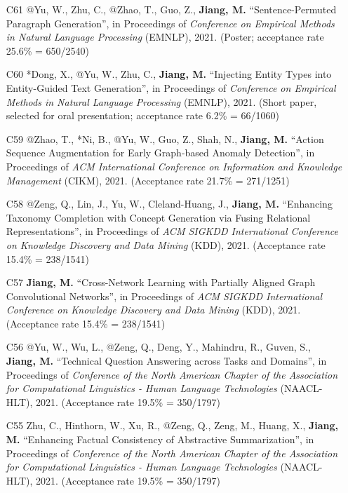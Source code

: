 \documentclass[10pt]{article}
\newenvironment{myindentpar}[1]%
{\begin{list}{}%
         {\setlength{\leftmargin}{#1}}%
         \item[]%
}
{\end{list}}
\newcounter{list}
\begin{document}
\begin{myindentpar}{0.00cm}
\begin{enumerate}[leftmargin=.5cm]
\item[C61] @Yu, W., Zhu, C., @Zhao, T., Guo, Z., \textbf{Jiang, M.} ``Sentence-Permuted Paragraph Generation'', in Proceedings of \textit{Conference on Empirical Methods in Natural Language Processing} (EMNLP), 2021. (Poster; acceptance rate 25.6\% = 650/2540)

\item[C60] *Dong, X., @Yu, W., Zhu, C., \textbf{Jiang, M.} ``Injecting Entity Types into Entity-Guided Text Generation'', in Proceedings of \textit{Conference on Empirical Methods in Natural Language Processing} (EMNLP), 2021. (Short paper, selected for oral presentation; acceptance rate 6.2\% = 66/1060)

\item[C59] @Zhao, T., *Ni, B., @Yu, W., Guo, Z., Shah, N., \textbf{Jiang, M.} ``Action Sequence Augmentation for Early Graph-based Anomaly Detection'', in Proceedings of \textit{ACM International Conference on Information and Knowledge Management} (CIKM), 2021. (Acceptance rate 21.7\% = 271/1251)
		
\item[C58] @Zeng, Q., Lin, J., Yu, W., Cleland-Huang, J., \textbf{Jiang, M.} ``Enhancing Taxonomy Completion with Concept Generation via Fusing Relational Representations'', in Proceedings of \textit{ACM SIGKDD International Conference on Knowledge Discovery and Data Mining} (KDD), 2021. (Acceptance rate 15.4\% = 238/1541)

\item[C57] \textbf{Jiang, M.} ``Cross-Network Learning with Partially Aligned Graph Convolutional Networks'', in Proceedings of \textit{ACM SIGKDD International Conference on Knowledge Discovery and Data Mining} (KDD), 2021. (Acceptance rate 15.4\% = 238/1541)	

\item[C56] @Yu, W., Wu, L., @Zeng, Q., Deng, Y., Mahindru, R., Guven, S., \textbf{Jiang, M.} ``Technical Question Answering across Tasks and Domains'', in Proceedings of \textit{Conference of the North American Chapter of the Association for Computational Linguistics - Human Language Technologies} (NAACL-HLT), 2021. (Acceptance rate 19.5\% = 350/1797)

\item[C55] Zhu, C., Hinthorn, W., Xu, R., @Zeng, Q., Zeng, M., Huang, X., \textbf{Jiang, M.} ``Enhancing Factual Consistency of Abstractive Summarization'', in Proceedings of \textit{Conference of the North American Chapter of the Association for Computational Linguistics - Human Language Technologies} (NAACL-HLT), 2021. (Acceptance rate 19.5\% = 350/1797)


\end{enumerate}
\end{myindentpar}
\end{document}
